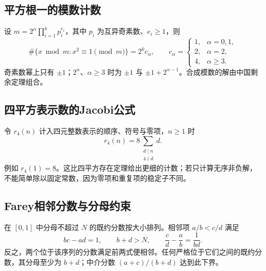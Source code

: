 \documentclass[../main.tex]{subfiles}
\begin{document}
\subsection{平方根一的模数计数}
设 $m=2^\alpha\prod_{i=1}^kp_i^{e_i}$，其中 $p_i$ 为互异奇素数、$e_i\ge1$，则
\[
\#\{x\bmod m:x^2\equiv1\pmod m\}=2^k c_\alpha,\qquad
c_\alpha=\begin{cases}1,&\alpha=0,1,\\2,&\alpha=2,\\4,&\alpha\ge3.\end{cases}
\]
奇素数幂上只有 $\pm1$；$2^\alpha$、$\alpha\ge3$ 时为 $\pm1$ 与 $\pm1+2^{\alpha-1}$。合成模数的解由中国剩余定理组合。
\subsection{四平方表示数的Jacobi公式}
令 $r_4(n)$ 计入四元整数表示的顺序、符号与零项，$n\ge1$ 时
\[
r_4(n)=8\sum_{\substack{d\mid n\\4\nmid d}}d.
\]
例如 $r_4(1)=8$。这比四平方存在定理给出更细的计数；若只计算无序非负解，不能简单除以固定常数，因为零项和重复项的稳定子不同。
\subsection{Farey相邻分数与分母约束}
在 $[0,1]$ 中分母不超过 $N$ 的既约分数按大小排列。相邻项 $a/b<c/d$ 满足
\[
bc-ad=1,\qquad b+d>N,\qquad
\frac cd-\frac ab=\frac1{bd}.
\]
反之，两个位于该序列的分数满足前两式便相邻。任何严格位于它们之间的既约分数，其分母至少为 $b+d$；中介分数 $(a+c)/(b+d)$ 达到此下界。
\clearpage
\end{document}

